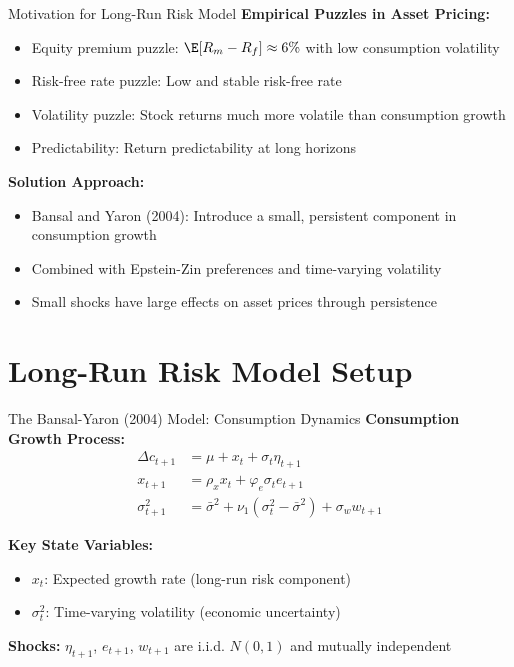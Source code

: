 \documentclass{beamer}
\begin{document}
\begin{frame}{Motivation for Long-Run Risk Model}
    \textbf{Empirical Puzzles in Asset Pricing:}
    \begin{itemize}
        \item Equity premium puzzle: $\E[R_m - R_f] \approx 6\%$ with low consumption volatility
        \item Risk-free rate puzzle: Low and stable risk-free rate
        \item Volatility puzzle: Stock returns much more volatile than consumption growth
        \item Predictability: Return predictability at long horizons
    \end{itemize}
    
    \vspace{0.3cm}
    \textbf{Solution Approach:}
    \begin{itemize}
        \item Bansal and Yaron (2004): Introduce a small, persistent component in consumption growth
        \item Combined with Epstein-Zin preferences and time-varying volatility
        \item Small shocks have large effects on asset prices through persistence
    \end{itemize}
\end{frame}

\section{Long-Run Risk Model Setup}

\begin{frame}{The Bansal-Yaron (2004) Model: Consumption Dynamics}
    \textbf{Consumption Growth Process:}
    \begin{align}
        \Delta c_{t+1} &= \mu + x_t + \sigma_t \eta_{t+1} \label{eq:cons}\\
        x_{t+1} &= \rho_x x_t + \varphi_e \sigma_t e_{t+1} \label{eq:x}\\
        \sigma_{t+1}^2 &= \bar{\sigma}^2 + \nu_1 (\sigma_t^2 - \bar{\sigma}^2) + \sigma_w w_{t+1} \label{eq:vol}
    \end{align}
    
    \vspace{0.3cm}
    \textbf{Key State Variables:}
    \begin{itemize}
        \item $x_t$: Expected growth rate (long-run risk component)
        \item $\sigma_t^2$: Time-varying volatility (economic uncertainty)
    \end{itemize}
    
    \vspace{0.3cm}
    \textbf{Shocks:} $\eta_{t+1}$, $e_{t+1}$, $w_{t+1}$ are i.i.d. $N(0,1)$ and mutually independent
\end{frame}
\end{document}
